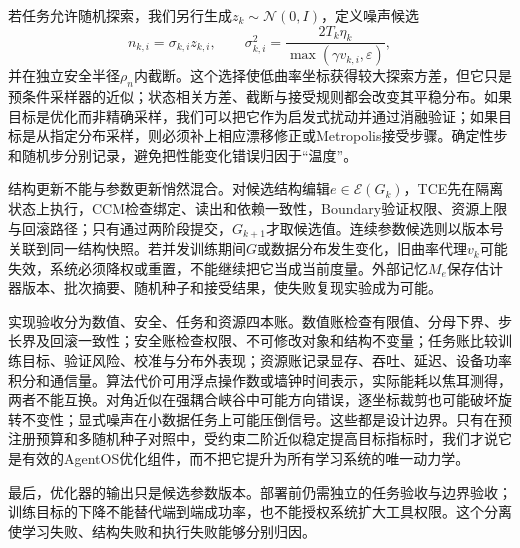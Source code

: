 若任务允许随机探索，我们另行生成$z_k\sim\mathcal N(0,I)$，定义噪声候选
\begin{equation}
n_{k,i}=\sigma_{k,i}z_{k,i},\qquad
\sigma_{k,i}^2=\frac{2T_k\eta_k}{\max(\gamma v_{k,i},\varepsilon)},
\end{equation}
并在独立安全半径$\rho_n$内截断。这个选择使低曲率坐标获得较大探索方差，但它只是预条件采样器的近似；状态相关方差、截断与接受规则都会改变其平稳分布。如果目标是优化而非精确采样，我们可以把它作为启发式扰动并通过消融验证；如果目标是从指定分布采样，则必须补上相应漂移修正或Metropolis接受步骤。确定性步和随机步分别记录，避免把性能变化错误归因于“温度”。

结构更新不能与参数更新悄然混合。对候选结构编辑$e\in\mathcal E(G_k)$，TCE先在隔离状态上执行，CCM检查绑定、读出和依赖一致性，Boundary验证权限、资源上限与回滚路径；只有通过两阶段提交，$G_{k+1}$才取候选值。连续参数候选则以版本号关联到同一结构快照。若并发训练期间$G$或数据分布发生变化，旧曲率代理$v_k$可能失效，系统必须降权或重置，不能继续把它当成当前度量。外部记忆$M_e$保存估计器版本、批次摘要、随机种子和接受结果，使失败复现实验成为可能。

实现验收分为数值、安全、任务和资源四本账。数值账检查有限值、分母下界、步长界及回滚一致性；安全账检查权限、不可修改对象和结构不变量；任务账比较训练目标、验证风险、校准与分布外表现；资源账记录显存、吞吐、延迟、设备功率积分和通信量。算法代价可用浮点操作数或墙钟时间表示，实际能耗以焦耳测得，两者不能互换。对角近似在强耦合峡谷中可能方向错误，逐坐标裁剪也可能破坏旋转不变性；显式噪声在小数据任务上可能压倒信号。这些都是设计边界。只有在预注册预算和多随机种子对照中，受约束二阶近似稳定提高目标指标时，我们才说它是有效的AgentOS优化组件，而不把它提升为所有学习系统的唯一动力学。

最后，优化器的输出只是候选参数版本。部署前仍需独立的任务验收与边界验收；训练目标的下降不能替代端到端成功率，也不能授权系统扩大工具权限。这个分离使学习失败、结构失败和执行失败能够分别归因。
